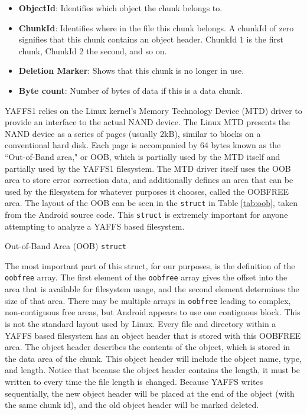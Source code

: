 \begin{itemize}
	\item {\bf ObjectId}: Identifies which object the chunk belongs to.\
	\item {\bf ChunkId}: Identifies where in the file this chunk belongs. 
		A chunkId of zero signifies that this chunk contains an object header. 
		ChunkId 1 is the first chunk, ChunkId 2 the second, and so on.
	\item {\bf Deletion Marker}: Shows that this chunk is no longer in use.
	\item {\bf Byte count}: Number of bytes of data if this is a data chunk.
\end{itemize}
\cite{howyaffsworks}

YAFFS1 relies on the Linux kernel's Memory Technology Device (MTD) driver to provide an interface to the actual NAND device.  The
Linux MTD presents the NAND device as a series of pages (usually 2kB), similar to blocks on a conventional hard disk.  Each page is
accompanied by 64 bytes known as the ``Out-of-Band area," or OOB, which is partially used by the MTD itself and partially used by
the YAFFS1 filesystem. The MTD driver itself uses the OOB area to store error correction data, and additionally defines an area that
can be used by the filesystem for whatever purposes it chooses, called the OOBFREE area.  The layout of the OOB can be seen in the
\texttt{struct} in Table \ref{tab:oob}, taken from the Android source code. This \texttt{struct} is extremely important for anyone
attempting to analyze a YAFFS based filesystem.

\begin{table}

\caption{Out-of-Band Area (OOB) \texttt{struct}}
\label{tab:oob}
\end{table}

The most important part of this struct, for our purposes, is the definition of the \texttt{oobfree} array.  The first element of the
\texttt{oobfree} array gives the offset into the area that is available for filesystem usage, and the second element determines the
size of that area.  There may be multiple arrays in \texttt{oobfree} leading to complex, non-contiguous free areas, but Android
appears to use one contiguous block.  This is not the standard layout used by Linux. Every file and directory within a YAFFS based
filesystem has an object header that is stored with this OOBFREE area. The object header describes the contents of the object, which
is stored in the data area of the chunk. This object header will include the object name, type, and length.  Notice that because the
object header contains the length, it must be written to every time the file length is changed.  Because YAFFS writes sequentially,
the new object header will be placed at the end of the object (with the same chunk id), and the old object header will be marked
deleted. 

